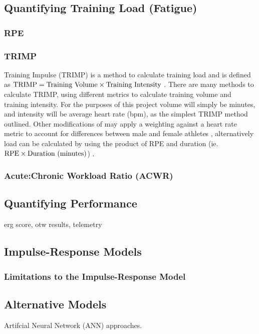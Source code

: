 \subsection{Quantifying Training Load (Fatigue)}
\subsubsection{RPE}
\subsubsection{TRIMP}
Training Impulse (TRIMP) is a method to calculate training load and is defined as  $\textnormal{TRIMP} = \textnormal{Training Volume} \times \textnormal{Training Intensity}$ \autocite{TRIMPmethod}. There are many methods to calculate TRIMP, using different metrics to calculate training volume and training intensity. For the purposes of this project volume will simply be minutes, and intensity will be average heart rate (bpm), as the simplest TRIMP method outlined. Other modifications of may apply a weighting against a heart rate metric to account for differences between male and female athletes \autocite{Morton1990}, alternatively load can be calculated by using the product of RPE and duration (ie. $\textnormal{RPE} \times \textnormal{Duration (minutes)}$) .

\subsubsection{Acute:Chronic Workload Ratio (ACWR)}

\subsection{Quantifying Performance}
erg score, otw results, telemetry

\subsection{Impulse-Response Models}
\subsubsection{Limitations to the Impulse-Response Model}

\subsection{Alternative Models}
Artifcial Neural Network (ANN) approaches. 
